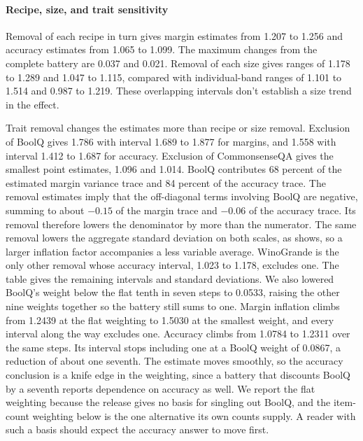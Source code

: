\paragraph{Recipe, size, and trait sensitivity}
Removal of each recipe in turn gives margin estimates from 1.207 to 1.256 and accuracy estimates from 1.065 to 1.099. The maximum changes from the complete battery are 0.037 and 0.021. Removal of each size gives ranges of 1.178 to 1.289 and 1.047 to 1.115, compared with individual-band ranges of 1.101 to 1.514 and 0.987 to 1.219. These overlapping intervals don't establish a size trend in the effect.

Trait removal changes the estimates more than recipe or size removal. Exclusion of BoolQ gives 1.786 with interval 1.689 to 1.877 for margins, and 1.558 with interval 1.412 to 1.687 for accuracy. Exclusion of CommonsenseQA gives the smallest point estimates, 1.096 and 1.014. BoolQ contributes 68 percent of the estimated margin variance trace and 84 percent of the accuracy trace. The removal estimates imply that the off-diagonal terms involving BoolQ are negative, summing to about $-0.15$ of the margin trace and $-0.06$ of the accuracy trace. Its removal therefore lowers the denominator by more than the numerator. The same removal lowers the aggregate standard deviation on both scales, as  shows, so a larger inflation factor accompanies a less variable average. WinoGrande is the only other removal whose accuracy interval, 1.023 to 1.178, excludes one. The table gives the remaining intervals and standard deviations. We also lowered BoolQ's weight below the flat tenth in seven steps to 0.0533, raising the other nine weights together so the battery still sums to one. Margin inflation climbs from 1.2439 at the flat weighting to 1.5030 at the smallest weight, and every interval along the way excludes one. Accuracy climbs from 1.0784 to 1.2311 over the same steps. Its interval stops including one at a BoolQ weight of 0.0867, a reduction of about one seventh. The estimate moves smoothly, so the accuracy conclusion is a knife edge in the weighting, since a battery that discounts BoolQ by a seventh reports dependence on accuracy as well. We report the flat weighting because the release gives no basis for singling out BoolQ, and the item-count weighting below is the one alternative its own counts supply. A reader with such a basis should expect the accuracy answer to move first.

